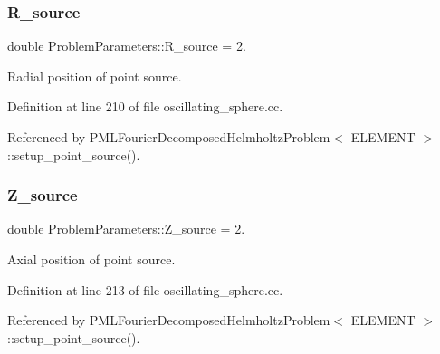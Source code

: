 \mbox{\label{namespaceProblemParameters_a42c148c7f3bed95827acf8d86c2c6089}} 
\subsubsection{\texorpdfstring{R\+\_\+source}{R\_source}}
{\footnotesize\ttfamily double Problem\+Parameters\+::\+R\+\_\+source = 2.}



Radial position of point source. 



Definition at line 210 of file oscillating\+\_\+sphere.\+cc.



Referenced by P\+M\+L\+Fourier\+Decomposed\+Helmholtz\+Problem$<$ E\+L\+E\+M\+E\+N\+T $>$\+::setup\+\_\+point\+\_\+source().

\mbox{\label{namespaceProblemParameters_a346993de7a274e1828af3f8fc8ca8b13}} 
\subsubsection{\texorpdfstring{Z\+\_\+source}{Z\_source}}
{\footnotesize\ttfamily double Problem\+Parameters\+::\+Z\+\_\+source = 2.}



Axial position of point source. 



Definition at line 213 of file oscillating\+\_\+sphere.\+cc.



Referenced by P\+M\+L\+Fourier\+Decomposed\+Helmholtz\+Problem$<$ E\+L\+E\+M\+E\+N\+T $>$\+::setup\+\_\+point\+\_\+source().

